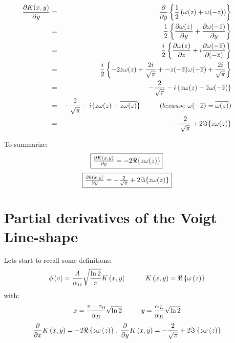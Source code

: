 \documentclass[10pt,a4paper]{report}
\begin{document}
\begin{flushleft}
\begin{eqnarray*}
\frac{\partial K(x,y)}{\partial y} 
&=& \frac{\partial}{\partial y} \left\{ \frac{1}{2}
\left( \omega(z)+\omega(-\bar{z})\right) \right\}\\
&=&\frac{1}{2}\left\{\frac{\partial\omega(z)}{\partial y}+\frac{\partial\omega(-\bar{z})}{\partial y}\right\}\\
&=& {i\over 2}\left\{ {\partial \omega(z)\over \partial z} + i{\partial \omega(-\overline{z})\over \partial (-\overline{z})}\right\} \\
&=& {i\over 2}\left\{-2z\omega(z) + {2i\over \sqrt{\pi}} +  -z(-\overline{z})\omega(-\overline{z}) + {2i\over \sqrt{\pi}}\right\}\\
&=& -{2\over \sqrt{\pi}} -i\left\{z\omega(z) - \overline{z}\omega(-\overline{z})\right\}\\
&=& -{2\over \sqrt{\pi}} -i\{z\omega(z) - \overline{z\omega(z)}\} 
\hspace{1cm} (because\,\, \omega(-\overline{z}) = \overline{\omega(z)})\\
&=& -{2\over \sqrt{\pi}} + 2 \Im\{z\omega(z)\}
\end{eqnarray*}

To summarize:
\begin{equation}
\framebox {$ {\partial K(x,y)\over \partial y} = -2 \Re\{z\omega(z)\} $}
\end{equation}
\begin{equation}
\framebox {${\partial k(x,y)\over \partial y} = -{2\over \sqrt{\pi}} + 2 \Im\{z\omega(z)\}  $}
\end{equation}


\section{Partial derivatives of the Voigt Line-shape}
Lets start to recall some definitions:
$$
\phi \left( v \right)={A \over {\alpha_D}}\sqrt {{{\ln{2}} \over
\pi }}K\left( {x,y} \right) \hspace{1cm}
K\left( {x,y} \right)=\Re \left\{ {\omega \left( z
\right)} \right\}
$$
with:
$$
x={{v-v_0} \over {\alpha_D}}\sqrt {\ln{2}} \hspace{1cm}
y={{\alpha_L} \over {\alpha_D}}\sqrt {\ln{2}}
$$
$$
  {\partial  \over {\partial x}}K\left( {x,y} \right)=-2\Re \left\{ {z\omega
\left( z \right)} \right\},\,\, {\partial  \over {\partial y}}K\left( {x,y}
\right)=-{2 \over {\sqrt \pi }}+2\Im \left\{ {z\omega \left( z \right)}
\right\}
$$


\end{flushleft}
\end{document}
